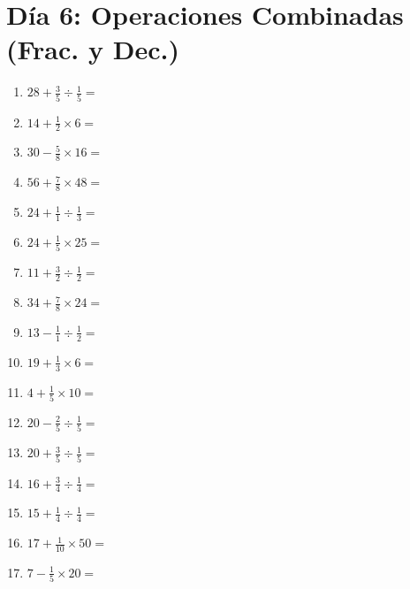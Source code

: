 \documentclass[12pt]{article}
\begin{document}
\section*{Día 6: Operaciones Combinadas (Frac. y Dec.)}
\begin{enumerate}
\item \large $ 28 + \frac{3}{5} \div \frac{1}{5} = $ \vspace{1.6cm}
\item \large $ 14 + \frac{1}{2} \times 6 = $ \vspace{1.6cm}
\item \large $ 30 - \frac{5}{8} \times 16 = $ \vspace{1.6cm}
\item \large $ 56 + \frac{7}{8} \times 48 = $ \vspace{1.6cm}
\item \large $ 24 + \frac{1}{1} \div \frac{1}{3} = $ \vspace{1.6cm}
\item \large $ 24 + \frac{1}{5} \times 25 = $ \vspace{1.6cm}
\item \large $ 11 + \frac{3}{2} \div \frac{1}{2} = $ \vspace{1.6cm}
\item \large $ 34 + \frac{7}{8} \times 24 = $ \vspace{1.6cm}
\item \large $ 13 - \frac{1}{1} \div \frac{1}{2} = $ \vspace{1.6cm}
\item \large $ 19 + \frac{1}{3} \times 6 = $ \vspace{1.6cm}
\newpage
\item \large $ 4 + \frac{1}{5} \times 10 = $ \vspace{1.6cm}
\item \large $ 20 - \frac{2}{5} \div \frac{1}{5} = $ \vspace{1.6cm}
\item \large $ 20 + \frac{3}{5} \div \frac{1}{5} = $ \vspace{1.6cm}
\item \large $ 16 + \frac{3}{4} \div \frac{1}{4} = $ \vspace{1.6cm}
\item \large $ 15 + \frac{1}{4} \div \frac{1}{4} = $ \vspace{1.6cm}
\item \large $ 17 + \frac{1}{10} \times 50 = $ \vspace{1.6cm}
\item \large $ 7 - \frac{1}{5} \times 20 = $ \vspace{1.6cm}

\end{enumerate}
\end{document}

